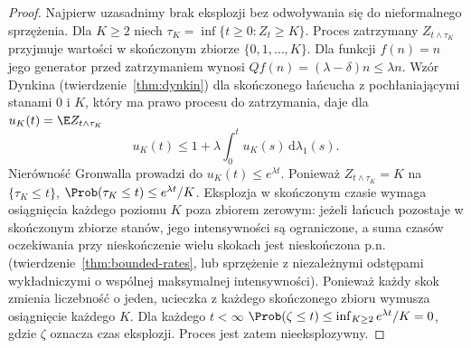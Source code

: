 \begin{proof}
Najpierw uzasadnimy brak eksplozji bez odwoływania się do
nieformalnego sprzężenia. Dla $K\ge2$ niech
$\tau_K=\inf\{t\ge0:Z_t\ge K\}$. Proces zatrzymany
$Z_{t\wedge\tau_K}$ przyjmuje wartości w skończonym
zbiorze $\{0,1,\ldots,K\}$. Dla funkcji $f(n)=n$
jego generator przed zatrzymaniem wynosi
$Qf(n)=(\lambda-\delta)n\le\lambda n$.
Wzór Dynkina (twierdzenie~\ref{thm:dynkin})
dla skończonego łańcucha z pochłaniającymi stanami
$0$ i $K$, który ma prawo procesu do zatrzymania, daje dla $u_K(t)=\E Z_{t\wedge\tau_K}$
\[
u_K(t)\le1+\lambda\int_0^tu_K(s)\,\mathrm d\lambda_1(s).
\]
Nierówność Gronwalla prowadzi do
$u_K(t)\le e^{\lambda t}$. Ponieważ
$Z_{t\wedge\tau_K}=K$ na $\{\tau_K\le t\}$,
$\Prob(\tau_K\le t)\le e^{\lambda t}/K$.
Eksplozja w skończonym czasie wymaga osiągnięcia
każdego poziomu $K$ poza zbiorem zerowym:
jeżeli łańcuch pozostaje w skończonym zbiorze stanów,
jego intensywności są ograniczone, a suma czasów
oczekiwania przy nieskończenie wielu skokach
jest nieskończona p.n. (twierdzenie~\ref{thm:bounded-rates},
lub sprzężenie z niezależnymi odstępami wykładniczymi
o wspólnej maksymalnej intensywności).
Ponieważ każdy skok zmienia liczebność o jeden,
ucieczka z każdego skończonego zbioru wymusza
osiągnięcie każdego $K$. Dla każdego $t<\infty$
$\Prob(\zeta\le t)\le\inf_{K\ge2}e^{\lambda t}/K=0$,
gdzie $\zeta$ oznacza czas eksplozji. Proces jest zatem
nieeksplozywny.


\end{proof}
